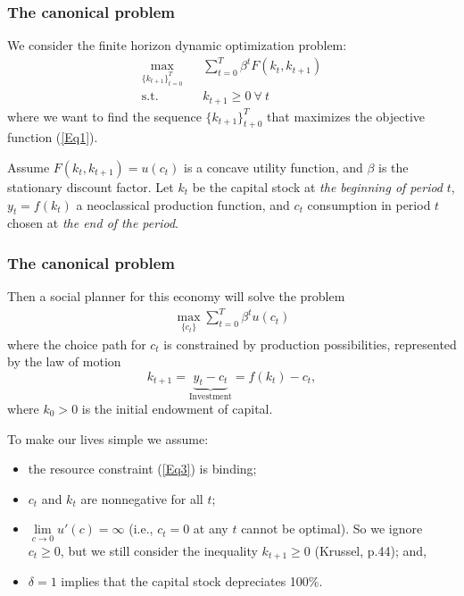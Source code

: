 \documentclass[10pt, handout]{beamer}
\begin{document}
\begin{frame}
\frametitle{ The canonical problem}
We consider the finite horizon dynamic optimization problem:%
\begin{eqnarray}\label{Eq1}
\max_{\{k_{t+1}\}^{T}_{t=0}} && \sum^{T}_{t=0} \beta^t F(k_t, k_{t+1}) \\ \nonumber
\text{s.t.} && k_{t+1} \geq 0 ~ \forall ~ t
\end{eqnarray}
where we want to find the sequence $\{k_{t+1}\}^{T}_{t+0}$ that maximizes the objective function (\ref{Eq1}). \vskip0.25in

Assume $F(k_t, k_{t+1}) = u(c_t)$ is a concave utility function, and $\beta$ is the stationary discount factor. Let $k_t$ be the capital stock at \textit{the beginning of period} $t$, $y_t = f(k_t)$ a neoclassical production function, and $c_t$ consumption in period $t$ chosen at \textit{the end of the period}.




\end{frame}




\begin{frame}
\frametitle{ The canonical problem}
Then a social planner for this economy will solve the problem
\begin{eqnarray}\label{Eq2}
\max_{\{c_{t}\}} \sum^{T}_{t=0} \beta^t u(c_{t})
\end{eqnarray}
where the choice path for $c_t$ is constrained by production possibilities, represented by the law of motion
\begin{equation}\label{Eq3}
k_{t+1} = \underset{\text{Investment}}{\underbrace{y_t - c_t}} = f(k_t) - c_t,
\end{equation} 
where $k_0 > 0$ is the initial endowment of capital. \vskip0.15in

To make our lives simple we assume:
\begin{itemize} \scriptsize
\item the resource constraint (\ref{Eq3}) is binding; 
\item $c_t$ and $k_t$ are nonnegative for all $t$; 
\item $\underset{{c \to 0}}{\lim} u'(c)=\infty$ (i.e., $c_t = 0$ at any $t$ cannot be optimal). So we ignore $c_{t} \geq 0$, but we still consider the inequality $k_{t+1} \geq 0$ (Krussel, p.44); and, 
\item $\delta = 1$ implies that the capital stock depreciates 100\%. 
\end{itemize}

\end{frame}
\end{document}
